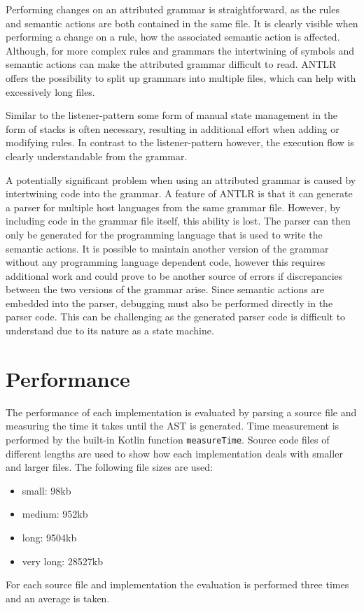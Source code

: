 Performing changes on an attributed grammar is straightforward, as the rules and semantic actions are both contained in the same file. It is clearly visible when performing a change on a rule, how the associated semantic action is affected. Although, for more complex rules and grammars the intertwining of symbols and semantic actions can make the attributed grammar difficult to read. ANTLR offers the possibility to split up grammars into multiple files, which can help with excessively long files. 

Similar to the listener-pattern some form of manual state management in the form of stacks is often necessary, resulting in additional effort when adding or modifying rules. In contrast to the listener-pattern however, the execution flow is clearly understandable from the grammar. 

A potentially significant problem when using an attributed grammar is caused by intertwining code into the grammar. A feature of ANTLR is that it can generate a parser for multiple host languages from the same grammar file. However, by including code in the grammar file itself, this ability is lost. The parser can then only be generated for the programming language that is used to write the semantic actions. It is possible to maintain another version of the grammar without any programming language dependent code, however this requires additional work and could prove to be another source of errors if discrepancies between the two versions of the grammar arise. Since semantic actions are embedded into the parser, debugging must also be performed directly in the parser code. This can be challenging as the generated parser code is difficult to understand due to its nature as a state machine.

\section{Performance}

The performance of each implementation is evaluated by parsing a source file and measuring the time it takes until the AST is generated. Time measurement is performed by the built-in Kotlin function \verb|measureTime|. Source code files of different lengths are used to show how each implementation deals with smaller and larger files. The following file sizes are used:

\begin{itemize}
    \item small: 98kb
    \item medium: 952kb
    \item long: 9504kb
    \item very long: 28527kb 
\end{itemize}

For each source file and implementation the evaluation is performed three times and an average is taken. 